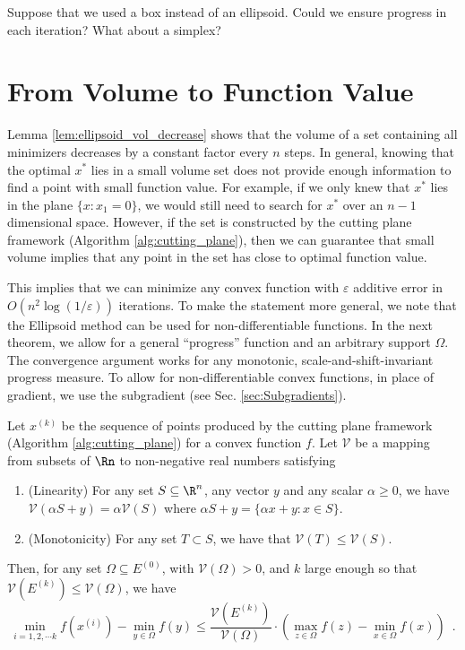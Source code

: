 \begin{xca}
Suppose that we used a box instead of an ellipsoid. Could we ensure
progress in each iteration? What about a simplex?
\end{xca}


\section{From Volume to Function Value\label{sec:vol2val}}

Lemma \ref{lem:ellipsoid_vol_decrease} shows that the volume of a
set containing all minimizers decreases by a constant factor every
$n$ steps. In general, knowing that the optimal $x^{*}$ lies in
a small volume set does not provide enough information to find a point
with small function value. For example, if we only knew that $x^{*}$
lies in the plane $\{x:x_{1}=0\}$, we would still need to search
for $x^{*}$ over an $n-1$ dimensional space. However, if the set
is constructed by the cutting plane framework (Algorithm \ref{alg:cutting_plane}),
then we can guarantee that small volume implies that any point in
the set has close to optimal function value.

This implies that we can minimize any convex function with $\varepsilon$
additive error in $O(n^{2}\log(1/\varepsilon))$ iterations. To make
the statement more general, we note that the Ellipsoid method can
be used for non-differentiable functions. In the next theorem, we
allow for a general ``progress'' function and an arbitrary support
$\Omega$. The convergence argument works for any monotonic, scale-and-shift-invariant
progress measure. To allow for non-differentiable convex functions,
in place of gradient, we use the subgradient (see Sec. \ref{sec:Subgradients}). 
\begin{thm}
\label{thm:conv_opt}Let $x^{(k)}$ be the sequence of points produced
by the cutting plane framework (Algorithm \ref{alg:cutting_plane})
for a convex function $f$. Let $\mathcal{V}$ be a mapping from subsets
of $\Rn$ to non-negative real numbers satisfying
\begin{enumerate}
\item (Linearity) For any set $S\subseteq\R^{n}$, any vector $y$ and any
scalar $\alpha\geq0$, we have $\mathcal{V}(\alpha S+y)=\alpha\mathcal{V}(S)$
where $\alpha S+y=\{\alpha x+y:x\in S\}$.
\item (Monotonicity) For any set $T\subset S$, we have that $\mathcal{V}(T)\leq\mathcal{V}(S)$.
\end{enumerate}
Then, for any set $\Omega\subseteq E^{(0)}$, with $\mathcal{V}(\Omega)>0$,
and $k$ large enough so that $\mathcal{V}(E^{(k)})\le\mathcal{V}(\Omega)$,
we have
\[
\min_{i=1,2,\cdots k}f(x^{(i)})-\min_{y\in\Omega}f(y)\leq\frac{\mathcal{V}(E^{(k)})}{\mathcal{V}(\Omega)}\cdot\left(\max_{z\in\Omega}f(z)-\min_{x\in\Omega}f(x)\right)\enspace.
\]
\end{thm}

